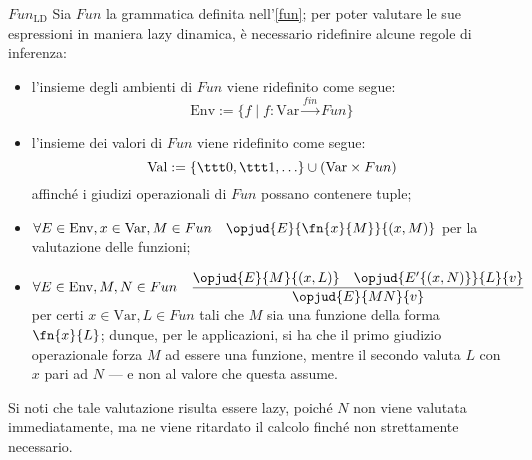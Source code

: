 \documentclass[a4paper, 12pt]{report}
\begin{document}
    \begin{framedobs}{$Fun_\mathrm{LD}$}
        Sia $Fun$ la grammatica definita nell'\cref{fun}; per poter valutare le sue espressioni in maniera lazy dinamica, è necessario ridefinire alcune regole di inferenza:

        \begin{itemize}
            \item l'insieme degli ambienti di $Fun$ viene ridefinito come segue: $$\mathrm{Env} := \{ f \mid f: \mathrm{Var} \xrightarrow{fin} Fun \}$$
            \item l'insieme dei valori di $Fun$ viene ridefinito come segue: $$\mathrm{Val} := \{ \ttt 0, \ttt 1, \ldots \} \cup (\mathrm{Var} \times Fun)$$ affinché i giudizi operazionali di $Fun$ possano contenere tuple;
            \item $\forall E \in \mathrm{Env}, x \in \mathrm{Var}, M \in Fun \quad \opjud{E}{\fn{x}{M}}{(x,M)}$ per la valutazione delle funzioni;
            \item $\forall E \in \mathrm{Env}, M,N \in Fun \quad \dfrac{\opjud{E}{M}{(x,L)} \quad \opjud{E'\{(x,N)\}}{L}{v}}{\opjud{E}{MN}{v}}$ per certi $x \in \mathrm{Var}, L \in Fun$ tali che $M$ sia una funzione della forma $\fn{x}{L}$; dunque, per le applicazioni, si ha che il primo giudizio operazionale forza $M$ ad essere una funzione, mentre il secondo valuta $L$ con $x$ pari ad $N$ --- e non al valore che questa assume.
        \end{itemize}

        Si noti che tale valutazione risulta essere lazy, poiché $N$ non viene valutata immediatamente, ma ne viene ritardato il calcolo finché non strettamente necessario.
    \end{framedobs}
\end{document}
